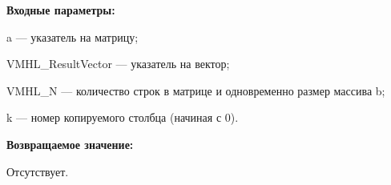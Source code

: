 \textbf{Входные параметры:}  
 
a --- указатель на матрицу;
 
VMHL\_ResultVector --- указатель на вектор;
 
VMHL\_N --- количество строк в матрице и одновременно размер массива b;
 
k --- номер копируемого столбца (начиная с 0).

\textbf{Возвращаемое значение:}

Отсутствует.